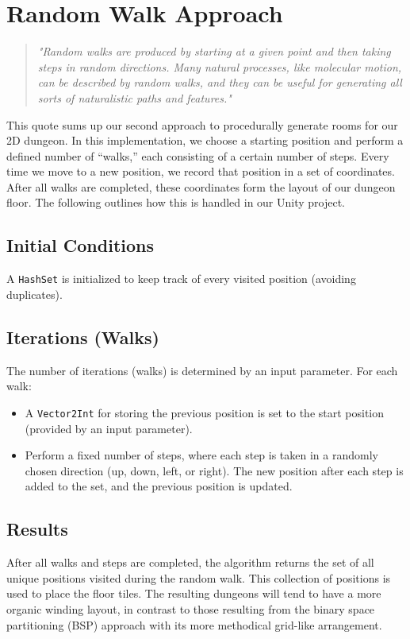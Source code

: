 \documentclass[a4paper, 12pt, one column, aas_macros]{article}
\begin{document}
\section{Random Walk Approach}
\begin{quote}
  \emph{"Random walks are produced by starting at a given point and then taking steps in random directions. Many natural processes, like molecular  motion, can be described by random walks, and they can be useful for  generating all sorts of naturalistic paths and features."}
  \cite[p.~286]{ShortAdams2017}
\end{quote}

This quote sums up our second approach to procedurally generate rooms for our 2D dungeon. In this implementation, we choose a starting position and perform a defined number of ``walks,'' each consisting of a certain number of steps. Every time we move to a new position, we record that position in a set of coordinates. After all walks are completed, these coordinates form the layout of our dungeon floor. The following outlines how this is handled in our Unity project.

\subsection{Initial Conditions}
A \texttt{HashSet} is initialized to keep track of every visited position (avoiding duplicates).

\subsection{Iterations (Walks)}
The number of iterations (walks) is determined by an input parameter. For each walk:
\begin{itemize}
  \item A \texttt{Vector2Int} for storing the previous position is set to the start position (provided by an input parameter).
  \item Perform a fixed number of steps, where each step is taken in a randomly chosen direction (up, down, left, or right). The new position after each step is added to the set, and the previous position is updated.  
\end{itemize}

\subsection{Results}
After all walks and steps are completed, the algorithm returns the set of all unique positions visited during the random walk. This collection of positions is used to place the floor tiles. The resulting dungeons will tend to have a more organic winding layout, in contrast to those resulting from the binary space partitioning (BSP) approach with its more methodical grid-like arrangement.
\end{document}
